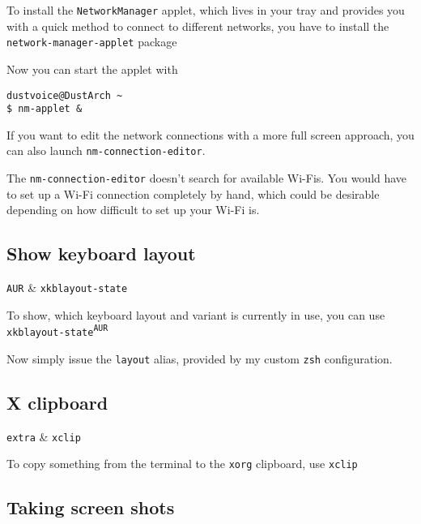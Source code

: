 \documentclass[10pt]{dustdoc}
\begin{document}
To install the \texttt{NetworkManager} applet, which lives in your tray and provides you with a quick method to connect to different networks, you have to install the \texttt{network-manager-applet} package

Now you can start the applet with

\begin{verbatim}
dustvoice@DustArch ~
$ nm-applet &
\end{verbatim}

If you want to edit the network connections with a more full screen approach, you can also launch \texttt{nm-connection-editor}.

\begin{NOTE}
    The \texttt{nm-connection-editor} doesn’t search for available Wi-Fis.
    You would have to set up a Wi-Fi connection completely by hand, which could be desirable depending on how difficult to set up your Wi-Fi is.
\end{NOTE}

\subsection{Show keyboard layout}
\label{sec:show-keyboard-layout}

\begin{packagetable}
    \texttt{AUR} & \texttt{xkblayout-state} \\ 
\end{packagetable}

To show, which keyboard layout and variant is currently in use, you can use \texttt{xkblayout-state\textsuperscript{\texttt{AUR}}}

Now simply issue the \texttt{layout} alias, provided by my custom \texttt{zsh} configuration.

\subsection{X clipboard}
\label{sec:x-clipboard}

\begin{packagetable}
    \texttt{extra} & \texttt{xclip} \\ 
\end{packagetable}

To copy something from the terminal to the \texttt{xorg} clipboard, use \texttt{xclip}

\subsection{Taking screen shots}
\label{sec:taking-screen-shots}
\end{document}
